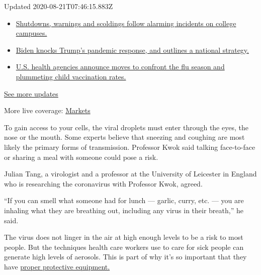Updated 2020-08-21T07:46:15.883Z

\begin{itemize}
\tightlist
\item
  \href{https://www.nytimes3xbfgragh.onion/2020/08/20/world/coronavirus-covid.html?action=click\&pgtype=Article\&state=default\&region=MAIN_CONTENT_1\&context=storylines_live_updates\#link-68774d88}{Shutdowns,
  warnings and scoldings follow alarming incidents on college campuses.}
\item
  \href{https://www.nytimes3xbfgragh.onion/2020/08/20/world/coronavirus-covid.html?action=click\&pgtype=Article\&state=default\&region=MAIN_CONTENT_1\&context=storylines_live_updates\#link-26b58724}{Biden
  knocks Trump's pandemic response, and outlines a national strategy.}
\item
  \href{https://www.nytimes3xbfgragh.onion/2020/08/20/world/coronavirus-covid.html?action=click\&pgtype=Article\&state=default\&region=MAIN_CONTENT_1\&context=storylines_live_updates\#link-4e542da3}{U.S.
  health agencies announce moves to confront the flu season and
  plummeting child vaccination rates.}
\end{itemize}

\href{https://www.nytimes3xbfgragh.onion/2020/08/20/world/coronavirus-covid.html?action=click\&pgtype=Article\&state=default\&region=MAIN_CONTENT_1\&context=storylines_live_updates}{See
more updates}

More live coverage:
\href{https://www.nytimes3xbfgragh.onion/live/2020/08/20/business/stock-market-today-coronavirus?action=click\&pgtype=Article\&state=default\&region=MAIN_CONTENT_1\&context=storylines_live_updates}{Markets}

To gain access to your cells, the viral droplets must enter through the
eyes, the nose or the mouth. Some experts believe that sneezing and
coughing are most likely the primary forms of transmission. Professor
Kwok said talking face-to-face or sharing a meal with someone could pose
a risk.

Julian Tang, a virologist and a professor at the University of Leicester
in England who is researching the coronavirus with Professor Kwok,
agreed.

``If you can smell what someone had for lunch --- garlic, curry, etc.
--- you are inhaling what they are breathing out, including any virus in
their breath,'' he said.

The virus does not linger in the air at high enough levels to be a risk
to most people. But the techniques health care workers use to care for
sick people can generate high levels of aerosols. This is part of why
it's so important that they have
\href{https://www.nytimes3xbfgragh.onion/interactive/2020/03/11/us/virus-health-workers.html}{proper
protective equipment.}

